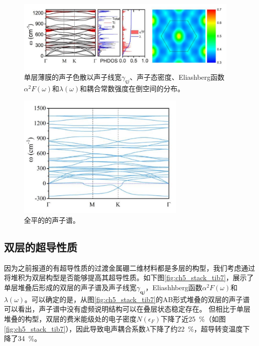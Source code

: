 \begin{figure}
  \includegraphics[width=0.96\textwidth]{figs/ch5_tib9_phonon.png}
  \centering
  \caption{单层薄膜的声子色散以声子线宽$\gamma_{qj}$、声子态密度、Eliashberg函数$\alpha^2 F(\omega)$和$\lambda(\omega)$和耦合常数强度在倒空间的分布。}
  \label{fig:ch5_tib9_phonon}
\end{figure}

\begin{figure}
  \includegraphics[width=0.72\textwidth]{figs/ch5_tib9_phonon_a.png}
  \centering
  \caption{全平的的声子谱。}
  \label{fig:ch5_tib9_phonon_a}
\end{figure}

\subsection{双层的超导性质}
因为之前报道的有超导性质的过渡金属硼二维材料都是多层的构型，我们考虑通过将堆积为双层构型是否能够提高其超导性质。如下图\ref{fig:ch5_stack_tib7}，展示了单层堆叠后形成的双层的声子谱及声子线宽$\gamma_{\bm{q}j}$，Eliashhberg函数$\alpha^2 F(\omega)$和$\lambda(\omega)$。可以确定的是，从图\ref{fig:ch5_stack_tib7}的AB形式堆叠的双层的声子谱可以看出，声子谱中没有虚频说明结构可以在叠层状态稳定存在。
但相比于单层堆叠的构型，双层的费米能级处的电子密度$N(\epsilon_F)$下降了近\SI{25}{\percent}（如图\ref{fig:ch5_stack_tib7}），因此导致电声耦合系数$\lambda$下降了约\SI{22}{\percent}，超导转变温度下降了\SI{34}{\percent}。

